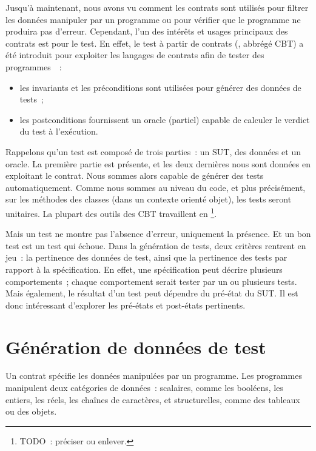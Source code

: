 Jusqu'à maintenant, nous avons vu comment les contrats sont utilisés pour
{\strong filtrer} les données manipuler par un programme ou pour vérifier que le
programme ne produira pas d'erreur. Cependant, l'un des intérêts et usages
principaux des contrats est pour le {\strong test}. En effet, le {\strong test à
partir de contrats} (, abbrégé CBT) a été
introduit pour exploiter les langages de contrats afin de tester des
programmes~~:

\begin{itemize}

\item les invariants et les préconditions sont utilisées pour générer des
données de tests~;

\item les postconditions fournissent un oracle (partiel) capable de calculer le
verdict du test à l'exécution.

\end{itemize}

Rappelons qu'un test est composé de trois parties~: un SUT, des données et un
oracle. La première partie est présente, et les deux dernières nous sont données
en exploitant le contrat. Nous sommes alors capable de générer des tests
automatiquement. Comme nous sommes au niveau du code, et plus précisément, sur
les méthodes des classes (dans un contexte orienté objet), les tests seront
{\strong unitaires}. La plupart des outils des CBT travaillent en
\footnote{TODO~: préciser ou enlever.}.

Mais un test ne montre pas l'absence d'erreur, uniquement la présence. Et un bon
test est un test qui échoue. Dans la génération de tests, deux critères rentrent
en jeu~: la pertinence des données de test, ainsi que la pertinence des tests
par rapport à la spécification. En effet, une spécification peut décrire
plusieurs comportements~; chaque comportement serait tester par un ou plusieurs
tests. Mais également, le résultat d'un test peut dépendre du pré-état du SUT.
Il est donc intéressant d'explorer les pré-états et post-états pertinents.

\section{Génération de données de test}

Un contrat spécifie les données manipulées par un programme. Les programmes
manipulent deux catégories de données~: scalaires, comme les booléens, les
entiers, les réels, les chaînes de caractères, et structurelles, comme des
tableaux ou des objets.

